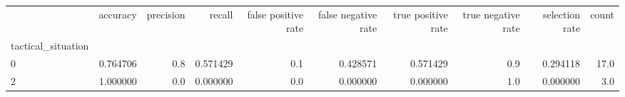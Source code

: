 \begin{tabular}{lrrrrrrrrr}
\toprule
{} &  accuracy &  precision &    recall &  false positive rate &  false negative rate &  true positive rate &  true negative rate &  selection rate &  count \\
tactical\_situation &           &            &           &                      &                      &                     &                     &                 &        \\
\midrule
0                  &  0.764706 &        0.8 &  0.571429 &                  0.1 &             0.428571 &            0.571429 &                 0.9 &        0.294118 &   17.0 \\
2                  &  1.000000 &        0.0 &  0.000000 &                  0.0 &             0.000000 &            0.000000 &                 1.0 &        0.000000 &    3.0 \\
\bottomrule
\end{tabular}
